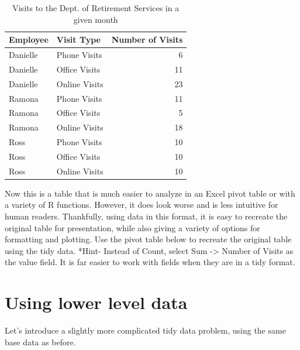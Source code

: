 \documentclass[
]{book}
\begin{document}
\begin{table}

\caption{\label{tab:unnamed-chunk-3}Visits to the Dept. of Retirement Services in a given month}
\centering
\begin{tabular}[t]{l|l|r}
\hline
Employee & Visit Type & Number of Visits\\
\hline
Danielle & Phone Visits & 6\\
\hline
Danielle & Office Visits & 11\\
\hline
Danielle & Online Visits & 23\\
\hline
Ramona & Phone Visits & 11\\
\hline
Ramona & Office Visits & 5\\
\hline
Ramona & Online Visits & 18\\
\hline
Ross & Phone Visits & 10\\
\hline
Ross & Office Visits & 10\\
\hline
Ross & Online Visits & 10\\
\hline
\end{tabular}
\end{table}

Now this is a table that is much easier to analyze in an Excel pivot table or with a variety of R functions. However, it does look worse and is less intuitive for human readers. Thankfully, using data in this format, it is easy to recreate the original table for presentation, while also giving a variety of options for formatting and plotting. Use the pivot table below to recreate the original table using the tidy data. *Hint- Instead of Count, select Sum -\textgreater{} Number of Visits as the value field. It is far easier to work with fields when they are in a tidy format.

\hypertarget{using-lower-level-data}{%
\section{Using lower level data}\label{using-lower-level-data}}

Let's introduce a slightly more complicated tidy data problem, using the same base data as before.
\end{document}
